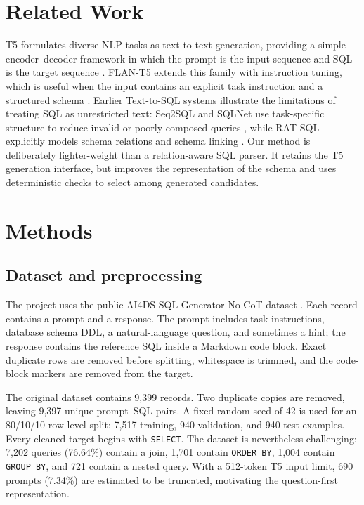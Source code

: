 \documentclass[10pt,a4paper]{article}
\begin{document}
\section{Related Work}
T5 formulates diverse NLP tasks as text-to-text generation, providing a simple encoder--decoder framework in which the prompt is the input sequence and SQL is the target sequence \cite{raffel2020t5}. FLAN-T5 extends this family with instruction tuning, which is useful when the input contains an explicit task instruction and a structured schema \cite{chung2022scaling}. Earlier Text-to-SQL systems illustrate the limitations of treating SQL as unrestricted text: Seq2SQL and SQLNet use task-specific structure to reduce invalid or poorly composed queries \cite{zhong2017seq2sql,xu2017sqlnet}, while RAT-SQL explicitly models schema relations and schema linking \cite{wang2020ratsql}. Our method is deliberately lighter-weight than a relation-aware SQL parser. It retains the T5 generation interface, but improves the representation of the schema and uses deterministic checks to select among generated candidates.

\section{Methods}
\subsection{Dataset and preprocessing}
The project uses the public AI4DS SQL Generator No CoT dataset \cite{ai4ds}. Each record contains a prompt and a response. The prompt includes task instructions, database schema DDL, a natural-language question, and sometimes a hint; the response contains the reference SQL inside a Markdown code block. Exact duplicate rows are removed before splitting, whitespace is trimmed, and the code-block markers are removed from the target.

The original dataset contains 9,399 records. Two duplicate copies are removed, leaving 9,397 unique prompt--SQL pairs. A fixed random seed of 42 is used for an 80/10/10 row-level split: 7,517 training, 940 validation, and 940 test examples. Every cleaned target begins with \texttt{SELECT}. The dataset is nevertheless challenging: 7,202 queries (76.64\%) contain a join, 1,701 contain \texttt{ORDER BY}, 1,004 contain \texttt{GROUP BY}, and 721 contain a nested query. With a 512-token T5 input limit, 690 prompts (7.34\%) are estimated to be truncated, motivating the question-first representation.
\end{document}
